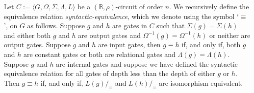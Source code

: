 \documentclass[../paper.tex]{subfiles}
\begin{document}



\begin{definition}
  Let $C := \langle G, \Omega, \Sigma, \Lambda, L \rangle$ be a $(\mathbb{B},
  \rho)$-circuit of order $n$. We recursively define the equivalence relation
  \emph{syntactic-equivalence}, which we denote using the symbol `$\equiv$', on
  $G$ as follows. Suppose $g$ and $h$ are gates in $C$ such that $\Sigma (g) =
  \Sigma(h)$ and either both $g$ and $h$ are output gates and $\Omega^{-1}(g) =
  \Omega^{-1}(h)$ or neither are output gates. Suppose $g$ and $h$ are input
  gates, then $g \equiv h$ if, and only if, both $g$ and $h$ are constant gates
  or both are relational gates and $\Lambda(g) = \Lambda (h)$.  Suppose $g$ and
  $h$ are internal gates and suppose we have defined the
  syntactic-equivalence relation for all gates of depth less than the depth of
  either $g$ or $h$. Then $g \equiv h$ if, and only if, $L(g) /_\equiv$ and
  $L(h) /_\equiv$ are isomorphism-equivalent.
\end{definition}
\end{document}
